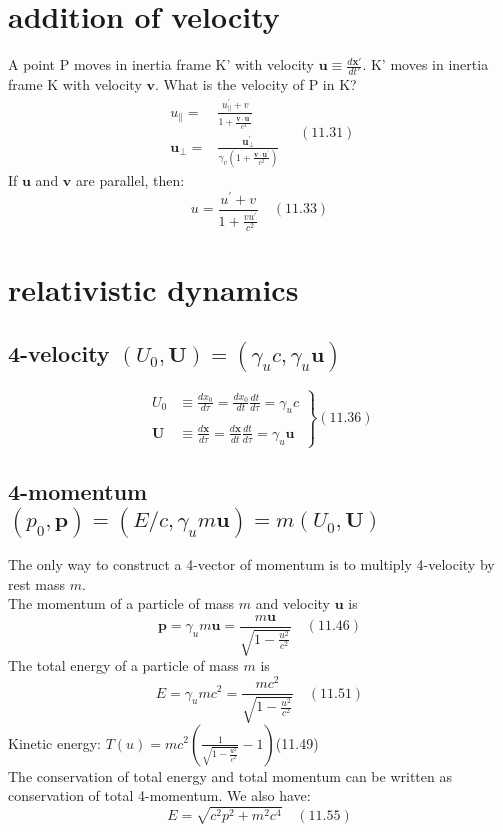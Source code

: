 \documentclass[10pt, oneside]{article}   	%
\begin{document}
\begin{multicols}{2}
\section{addition of velocity}
A point P moves in inertia frame K' with velocity $\boldsymbol{u}\equiv\frac{d \mathbf{x'}}{dt'}$. K' moves in inertia frame K with velocity $\boldsymbol{v}$. What is the velocity of P in K?
$$\begin{aligned} 
u_{\|}=& \frac{u_{\|}^{\prime}+v}{1+\frac{\mathbf{v} \cdot \mathbf{u}^{\prime}}{c^{2}}} \\ 
\mathbf{u}_{\perp}=& \frac{\mathbf{u}_{\perp}^{\prime}}{\gamma_{v}\left(1+\frac{\mathbf{v} \cdot \mathbf{u}^{\prime}}{c^{2}}\right)} 
\end{aligned}\quad(11.31)$$
If $\boldsymbol{u}$ and $\boldsymbol{v}$ are parallel, then:\\
$$u=\frac{u^{\prime}+v}{1+\frac{v u^{\prime}}{c^{2}}}\quad(11.33)$$

\section{relativistic dynamics}
\subsection{4-velocity $(U_0, \mathbf{U})=(\gamma_{u} c, \gamma_{u} \mathbf{u})$}
$$\left.\begin{array}{rl}
U_{0} & \equiv \frac{d x_{0}}{d \tau}=\frac{d x_{0}}{d t} \frac{d t}{d \tau}=\gamma_{u} c \\\\
\mathbf{U} & \equiv \frac{d \mathbf{x}}{d \tau}=\frac{d \mathbf{x}}{d t} \frac{d t}{d \tau}=\gamma_{u} \mathbf{u}
\end{array}\right\}(11.36)$$

\subsection{4-momentum $(p_0, \mathbf{p})=(E/c, \gamma_u m \mathbf{u})=m(U_0, \mathbf{U})$}
The only way to construct a 4-vector of momentum is to multiply 4-velocity by rest mass $m$.\\
The momentum of a particle of mass $m$ and velocity $\mathbf{u}$ is
$$\mathbf{p}=\gamma_u m \mathbf{u}=\frac{m \mathbf{u}}{\sqrt{1-\frac{u^2}{c^2}}}\quad(11.46)$$ 
The total energy of a particle of mass $m$ is $$E=\gamma_u m c^2=\frac{m c^2}{\sqrt{1-\frac{u^2}{c^2}}}\quad (11.51)$$
Kinetic energy: $T(u)=mc^2(\frac{1}{\sqrt{1-\frac{u^2}{c^2}}}-1)$\quad(11.49)\\
The conservation of total energy and total momentum can be written as conservation of total 4-momentum.
We also have:\\
$$E=\sqrt{c^2 p^2+m^2 c^4}\quad(11.55)$$


\end{multicols}
\end{document}
